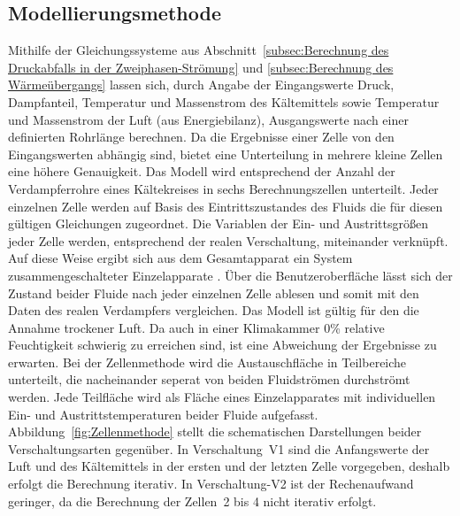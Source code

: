 \subsection{Modellierungsmethode}
\label{subsec:Das Modell}

Mithilfe der Gleichungssysteme aus Abschnitt~\ref{subsec:Berechnung des Druckabfalls in der Zweiphasen-Strömung} und \ref{subsec:Berechnung des Wärmeübergangs} lassen sich, durch Angabe der Eingangswerte Druck, Dampfanteil, Temperatur und Massenstrom des Kältemittels sowie Temperatur und Massenstrom der Luft (aus Energiebilanz), Ausgangswerte nach einer definierten Rohrlänge berechnen. Da die Ergebnisse einer Zelle von den Eingangswerten abhängig sind, bietet eine Unterteilung in mehrere kleine Zellen eine höhere Genauigkeit. Das Modell wird entsprechend der Anzahl der Verdampferrohre eines Kältekreises in sechs Berechnungszellen unterteilt. Jeder einzelnen Zelle werden auf Basis des Eintrittszustandes des Fluids die für diesen gültigen Gleichungen zugeordnet. Die Variablen der Ein- und Austrittsgrößen jeder Zelle werden, entsprechend der realen Verschaltung, miteinander verknüpft. Auf diese Weise ergibt sich aus dem Gesamtapparat ein System zusammengeschalteter Einzelapparate \cite{LehrstuhlfurWarmeundStoffubertragung.b}.
Über die Benutzeroberfläche lässt sich der Zustand beider Fluide nach jeder einzelnen Zelle ablesen und somit mit den Daten des realen Verdampfers vergleichen.
Das Modell ist gültig für den die Annahme trockener Luft. Da auch in einer Klimakammer \unit{0}{\%} relative Feuchtigkeit schwierig zu erreichen sind, ist eine Abweichung der Ergebnisse zu erwarten. \newline
Bei der Zellenmethode wird die Austauschfläche in Teilbereiche unterteilt, die nacheinander seperat von beiden Fluidströmen durchströmt werden. Jede Teilfläche wird als Fläche eines Einzelapparates mit individuellen Ein- und Austrittstemperaturen beider Fluide aufgefasst. Abbildung~\ref{fig:Zellenmethode} stellt die schematischen Darstellungen beider Verschaltungsarten gegenüber. In Verschaltung~V1 sind die Anfangswerte der Luft und des Kältemittels in der ersten und der letzten Zelle vorgegeben, deshalb erfolgt die Berechnung iterativ. In Verschaltung-V2 ist der Rechenaufwand geringer, da die Berechnung der Zellen~2 bis 4 nicht iterativ erfolgt.

